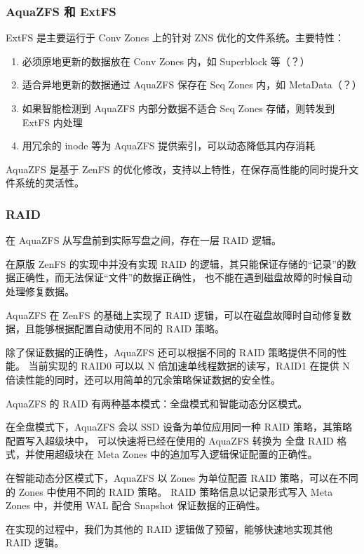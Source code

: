 \subsubsection*{AquaZFS 和 ExtFS}

ExtFS 是主要运行于 Conv Zones 上的针对 ZNS 优化的文件系统。主要特性：

\begin{enumerate}
    \item 必须原地更新的数据放在 Conv Zones 内，如 Superblock 等（？）
    \item 适合异地更新的数据通过 AquaZFS 保存在 Seq Zones 内，如 MetaData（？）
    \item 如果智能检测到 AquaZFS 内部分数据不适合 Seq Zones 存储，则转发到 ExtFS 内处理
    \item 用冗余的 inode 等为 AquaZFS 提供索引，可以动态降低其内存消耗
\end{enumerate}

AquaZFS 是基于 ZenFS 的优化修改，支持以上特性，在保存高性能的同时提升文件系统的灵活性。

\subsubsection*{RAID}

在 AquaZFS 从写盘前到实际写盘之间，存在一层 RAID 逻辑。

在原版 ZenFS 的实现中并没有实现 RAID 的逻辑，其只能保证存储的“记录”的数据正确性，而无法保证“文件”的数据正确性，
也不能在遇到磁盘故障的时候自动处理修复数据。

AquaZFS 在 ZenFS 的基础上实现了 RAID 逻辑，可以在磁盘故障时自动修复数据，且能够根据配置自动使用不同的 RAID 策略。

除了保证数据的正确性，AquaZFS 还可以根据不同的 RAID 策略提供不同的性能。
当前实现的 RAID0 可以以 N 倍加速单线程数据的读写，RAID1 在提供 N 倍读性能的同时，还可以用简单的冗余策略保证数据的安全性。

AquaZFS 的 RAID 有两种基本模式：全盘模式和智能动态分区模式。

在全盘模式下，AquaZFS 会以 SSD 设备为单位应用同一种 RAID 策略，其策略配置写入超级块中，
可以快速将已经在使用的 AquaZFS 转换为 全盘 RAID 格式，并使用超级块在 Meta Zones 中的追加写入逻辑保证配置的正确性。

在智能动态分区模式下，AquaZFS 以 Zones 为单位配置 RAID 策略，可以在不同的 Zones 中使用不同的 RAID 策略。
RAID 策略信息以记录形式写入 Meta Zones 中，并使用 WAL 配合 Snapshot 保证数据的正确性。

在实现的过程中，我们为其他的 RAID 逻辑做了预留，能够快速地实现其他 RAID 逻辑。

